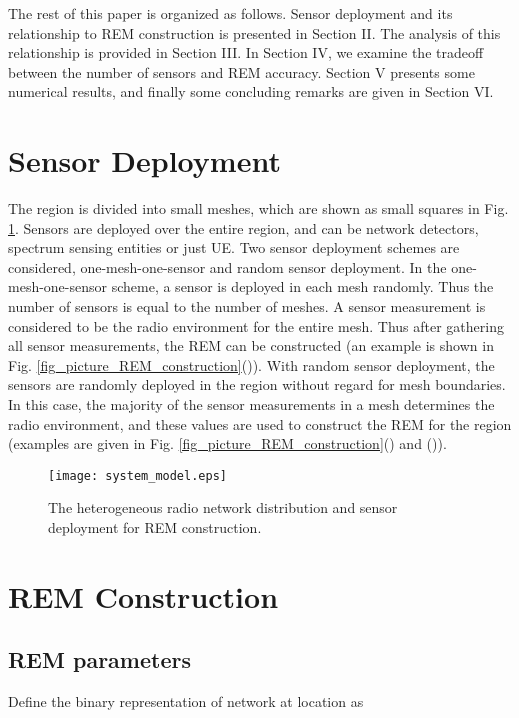 \documentclass[conference]{IEEEtran}
\begin{document}
The rest of this paper is organized as follows.
Sensor deployment and its relationship to REM construction is presented in Section II.
The analysis of this relationship is provided in Section III.
In Section IV, we examine the tradeoff between the number of sensors and REM accuracy.
Section V presents some numerical results, and finally some concluding remarks are given in Section VI.

\section{Sensor Deployment}

The region is divided into small meshes, which are shown as small squares in Fig. \ref{fig_system_model}.
Sensors are deployed over the entire region, and can be network detectors, spectrum sensing entities or just UE.
Two sensor deployment schemes are considered, one-mesh-one-sensor and random sensor deployment.
In the one-mesh-one-sensor scheme, a sensor is deployed in each mesh randomly.
Thus the number of sensors is equal to the number of meshes.
A sensor measurement is considered to be the radio environment for the entire mesh.
Thus after gathering all sensor measurements, the REM can be constructed (an example is shown in Fig. \ref{fig_picture_REM_construction}()).
With random sensor deployment, the sensors are randomly deployed in the region without regard for mesh boundaries.
In this case, the majority of the sensor measurements in a mesh determines the radio environment, and these values are
used to construct the REM for the region (examples are given in Fig. \ref{fig_picture_REM_construction}() and ()).

\begin{figure}[!t]
\centering
\texttt{[image: system\_model.eps]}
\caption{The heterogeneous radio network distribution and sensor deployment for REM construction.} \label{fig_system_model}
\end{figure}

\section{REM Construction}

\subsection{REM parameters}

Define the binary representation of network  at location  as
\end{document}
